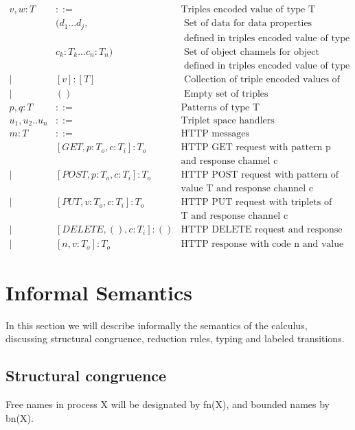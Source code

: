 \begin{eqnarray*}
  v,w:T & ::=  & \mbox{Triples encoded value of type T} \\
      &  (d_1 ... d_j,  & \mbox{ Set of data for data properties} \\
      &    & \mbox{ defined in triples encoded value of type T} \\
      &  c_k:T_k ... c_n:T_n)  & \mbox{ Set of object channels for object properties} \\
      &    & \mbox{ defined in triples encoded value of type T} \\
    | & [v]:[T]  & \mbox{ Collection of triple encoded values of type T} \\
    | & ()  & \mbox{ Empty set of triples} \\
  p,q:T & ::= & \mbox{Patterns of type T} \\
  u_1,u_2 .. u_n & ::= & \mbox{Triplet space handlers} \\
 m:T & ::= & \mbox{HTTP messages} \\
      & [GET,p:T_o,c:T_i]:T_o& \mbox{HTTP GET request with pattern p}\\
      &                        &\mbox{and response channel c} \\
    | & [POST,p:T_o,c:T_i]:T_o& \mbox{HTTP POST request with pattern of} \\
      &                        &\mbox{value T and response channel c} \\
    | & [PUT,v:T_o,c:T_i]:T_o & \mbox{HTTP PUT request with triplets of value} \\
      &                       & \mbox{T and response channel c} \\
   | & [DELETE,(),c:T_i]:() & \mbox{HTTP DELETE request and response channel c} \\
    | & [n,v:T_o]:T_o & \mbox{HTTP response with code n and value T}
\end{eqnarray*}

\section{Informal Semantics}

In this section we will describe informally the semantics of the calculus, discussing structural congruence, reduction rules, typing and labeled transitions.

\subsection{Structural congruence}
Free names in process X will be designated by fn(X), and bounded names by bn(X).

